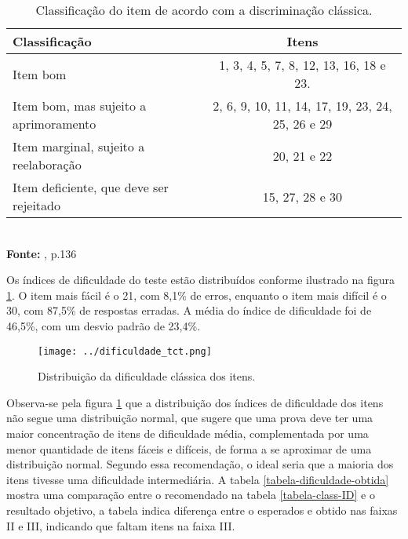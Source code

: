 \begin{table}[!htb]
	\centering
	\caption{Classificação do item de acordo com a discriminação clássica.}
	\label{class-disc-classica2}
	\begin{tabular}{lc}
		\hline
		\textbf{Classificação}  & \textbf{Itens}  \\ 
		\hline
	    Item bom  & 1, 3, 4, 5, 7, 8, 12, 13, 16, 18 e 23.  \\ 
		\hline
		Item bom, mas sujeito a aprimoramento & 2, 6, 9, 10, 11, 14, 17, 19, 23, 24, 25, 26 e 29\\ 
		\hline
		Item marginal, sujeito a reelaboração & 20, 21 e 22\\ 
		\hline
		Item deficiente, que deve ser rejeitado &  15, 27, 28 e 30\\ 
		\hline
	\end{tabular}\\
	\vspace*{0.5cm}
	\small{\textbf{Fonte:} , p.136}
\end{table}

Os índices de dificuldade do teste estão distribuídos conforme ilustrado na figura \ref{fig:hist_difi}. O item mais fácil é o 21, com 8,1\% de erros, enquanto o item mais difícil é o 30, com 87,5\% de respostas erradas. A média do índice de dificuldade foi de 46,5\%, com um desvio padrão de 23,4\%.

\begin{figure}[H]
	\centering
	\caption{Distribuição da dificuldade clássica dos itens.}
	\texttt{[image: ../dificuldade\_tct.png]}
	\parbox{\textwidth}{
		\centering %
	}
	\label{fig:hist_difi}
\end{figure}


Observa-se pela figura \ref{fig:hist_difi} que a distribuição dos índices de dificuldade dos itens não segue uma distribuição normal, que sugere que uma prova deve ter uma maior concentração de itens de dificuldade média, complementada por uma menor quantidade de itens fáceis e difíceis, de forma a se aproximar de uma distribuição normal. Segundo essa recomendação, o ideal seria que a maioria dos itens tivesse uma dificuldade intermediária. A tabela \ref{tabela-dificuldade-obtida} mostra uma comparação entre o recomendado na tabela \ref{tabela-class-ID} e o resultado objetivo, a tabela indica diferença entre o esperados e obtido nas faixas II e III, indicando que faltam itens na faixa III.

